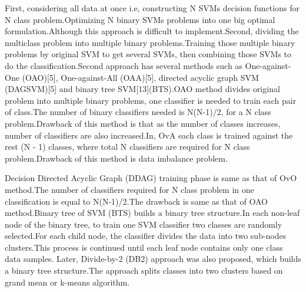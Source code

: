 \documentclass[a4paper, 10pt, conference]{ieeeconf}      %
\begin{document}
First, considering all data at once i.e, constructing N SVMs decision functions for N class problem.Optimizing N binary SVMs problems into one big optimal formulation.Although this approach is difficult to implement.Second, dividing the multiclass problem into multiple binary problems.Training those multiple binary problems by original SVM to get several SVMs, then combining those SVMs to do the classification.Second approach has several methods such as One-against-One (OAO)[5], One-against-All (OAA)[5], directed acyclic graph SVM (DAGSVM)[5] and binary tree SVM[13](BTS).OAO method divides original problem into multiple binary problems, one classifier is needed to train each pair of class.The number of binary classifiers needed is N(N-1)/2, for a N class problem.Drawback of this method is that as the number of classes increases, number of classifiers are also increased.In, OvA each class is trained against the rest (N - 1) classes, where total N classifiers are required for N class problem.Drawback of this method is data imbalance problem.
\par
Decision Directed Acyclic Graph (DDAG) training phase is same as that of OvO method.The number of classifiers required for N class problem in one classification is equal to N(N-1)/2.The drawback is same as that of OAO method.Binary tree of SVM (BTS) builds a binary tree structure.In each non-leaf node of the binary tree, to train one SVM classifier two classes are randomly selected.For each child node, the classifier divides the data into two sub-nodes clusters.This process is continued until each leaf node contains only one class data samples.
Later, Divide-by-2 (DB2) approach was also proposed, which builds a binary tree structure.The approach splits classes into two clusters based on grand mean or k-means algorithm.
\end{document}
